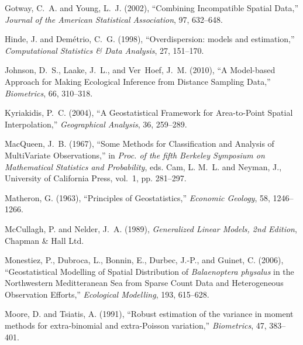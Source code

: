 \documentclass[12pt, titlepage]{article}\usepackage[]{graphicx}\usepackage[]{color}
\begin{document}
\begin{thebibliography}{47}
Gotway, C.~A. and Young, L.~J. (2002), \enquote{Combining Incompatible Spatial
  Data,} \textit{Journal of the American Statistical Association}, 97,
  632--648.

Hinde, J. and Dem{\'e}trio, C.~G. (1998), \enquote{Overdispersion: models and
  estimation,} \textit{Computational Statistics \& Data Analysis}, 27,
  151--170.

Johnson, D.~S., Laake, J.~L., and Ver~Hoef, J.~M. (2010), \enquote{A
  Model-based Approach for Making Ecological Inference from Distance Sampling
  Data,} \textit{Biometrics}, 66, 310--318.

Kyriakidis, P.~C. (2004), \enquote{A Geostatistical Framework for Area-to-Point
  Spatial Interpolation,} \textit{Geographical Analysis}, 36, 259--289.

MacQueen, J.~B. (1967), \enquote{Some Methods for Classification and Analysis
  of MultiVariate Observations,} in \textit{Proc. of the fifth Berkeley
  Symposium on Mathematical Statistics and Probability}, eds. Cam, L. M.~L. and
  Neyman, J., University of California Press, vol.~1, pp. 281--297.

Matheron, G. (1963), \enquote{Principles of Geostatistics,} \textit{Economic
  Geology}, 58, 1246--1266.

McCullagh, P. and Nelder, J.~A. (1989), \textit{Generalized Linear Models, 2nd
  Edition}, Chapman \& Hall Ltd.

Monestiez, P., Dubroca, L., Bonnin, E., Durbec, J.-P., and Guinet, C. (2006),
  \enquote{Geostatistical Modelling of Spatial Distribution of {\it
  Balaenoptera physalus} in the Northwestern Meditteranean Sea from Sparse
  Count Data and Heterogeneous Observation Efforts,} \textit{Ecological
  Modelling}, 193, 615--628.

Moore, D. and Tsiatis, A. (1991), \enquote{Robust estimation of the variance in
  moment methods for extra-binomial and extra-Poisson variation,}
  \textit{Biometrics}, 47, 383--401.


\end{thebibliography}
\end{document}

